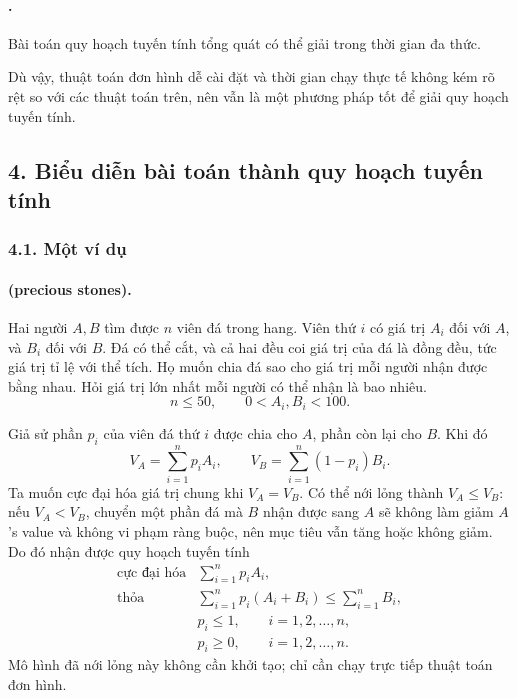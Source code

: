 \documentclass[11pt]{article}
\begin{document}
\paragraph{.}
Bài toán quy hoạch tuyến tính tổng quát có thể giải trong thời gian đa thức.

Dù vậy, thuật toán đơn hình dễ cài đặt và thời gian chạy thực tế không kém
rõ rệt so với các thuật toán trên, nên vẫn là một phương pháp tốt để giải quy
hoạch tuyến tính.

\subsection*{4. Biểu diễn bài toán thành quy hoạch tuyến tính}

\subsubsection*{4.1. Một ví dụ}

\paragraph{ (precious stones).}
Hai người \(A,B\) tìm được \(n\) viên đá trong hang. Viên thứ \(i\) có giá trị
\(A_i\) đối với \(A\), và \(B_i\) đối với \(B\). Đá có thể cắt, và cả hai đều
coi giá trị của đá là đồng đều, tức giá trị tỉ lệ với thể tích. Họ muốn chia
đá sao cho giá trị mỗi người nhận được bằng nhau. Hỏi giá trị lớn nhất mỗi
người có thể nhận là bao nhiêu.
\[
  n\le 50,\qquad 0<A_i,B_i<100.
\]

Giả sử phần \(p_i\) của viên đá thứ \(i\) được chia cho \(A\), phần còn lại
cho \(B\). Khi đó
\[
  V_A=\sum_{i=1}^{n}p_iA_i,\qquad
  V_B=\sum_{i=1}^{n}(1-p_i)B_i.
\]
Ta muốn cực đại hóa giá trị chung khi \(V_A=V_B\). Có thể nới lỏng thành
\(V_A\le V_B\): nếu \(V_A<V_B\), chuyển một phần đá mà \(B\) nhận được sang
\(A\) sẽ không làm giảm \(A\)'s value và không vi phạm ràng buộc, nên mục tiêu
vẫn tăng hoặc không giảm. Do đó nhận được quy hoạch tuyến tính
\[
\begin{array}{ll}
\text{cực đại hóa} & \displaystyle \sum_{i=1}^{n}p_iA_i,\\[0.4em]
\text{thỏa} &
  \displaystyle \sum_{i=1}^{n}p_i(A_i+B_i)\le \sum_{i=1}^{n}B_i,\\[0.4em]
& p_i\le 1,\qquad i=1,2,\ldots,n,\\
& p_i\ge 0,\qquad i=1,2,\ldots,n.
\end{array}
\]
Mô hình đã nới lỏng này không cần khởi tạo; chỉ cần chạy trực tiếp thuật toán
đơn hình.
\end{document}
